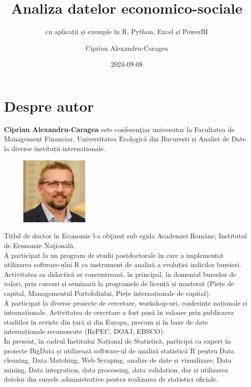 \documentclass[
  11pt,
  b5paper,
  nottoc]{book}
\title{Analiza datelor economico-sociale}
\subtitle{cu aplicații și exemple în R, Python, Excel și PowerBI}
\author{Ciprian Alexandru-Caragea}
\date{2024-09-08}
\renewcommand{\contentsname}{Cuprins}
\renewcommand*\contentsname{Table of contents}
\newcommand\contentsname{Table of contents}
\begin{document}
\frontmatter
\maketitle

\renewcommand*\contentsname{Cuprins}
{
\setcounter{tocdepth}{1}
\tableofcontents
}
\listoffigures
\listoftables

\mainmatter
{}

\chapter*{Despre autor}\label{despre-autor}


\setcounter{page}{3}

\textbf{Ciprian Alexandru-Caragea} este conferenţiar universitar la
Facultatea de Management Financiar, Universitatea Ecologică din
București și Analist de Date la diverse instituții internaționale.\\

\begin{figure}
  \begin{center}
    \includegraphics[width=0.3\textwidth]{images/Ciprian_DGINS2018.jpg}
  \end{center}
\end{figure}

Titlul de doctor în Economie l-a obţinut sub egida Academiei Române,
Institutul de Economie Naţională.\\
A participat la un program de studii postdoctorale în care a implementat
utilizarea software-ului R ca instrument de analiză a evoluției
indicilor bursieri.\\
Activitatea sa didactică se concentrează, în principal, în domeniul
burselor de valori, prin cursuri și seminarii la programele de licență
și masterat (Piețe de capital, Managementul Portofoliului, Piețe
internaționale de capital).\\
A participat la diverse proiecte de cercetare, workshop-uri, conferințe
naționale și internaționale. Activitatea de cercetare a fost pusă în
valoare prin publicarea studiilor în reviste din țară și din Europa,
precum și în baze de date internaționale recunoscute (RePEC, DOAJ,
EBSCO).\\
În prezent, în cadrul Institului Național de Statistică, participă ca
expert în proiecte BigData și utilizează software-ul de analiză
statistică R pentru Data cleaning, Data Matching, Web Scraping, analize
de date și vizualizare, Data mining, Data integration, data processing,
data validation, dar și utilizarea datelor din sursele administrative
pentru realizarea de statistici oficiale.
\end{document}
